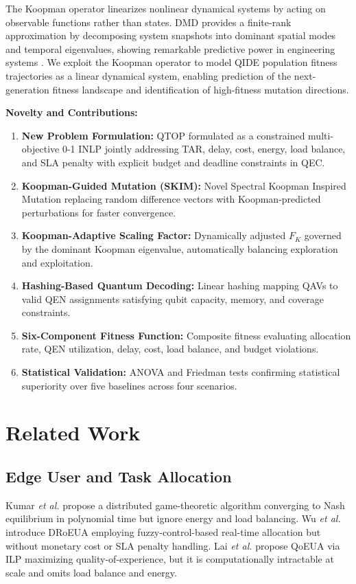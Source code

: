 \documentclass[10pt,twocolumn]{article}
\begin{document}
The Koopman operator \cite{ref10} linearizes nonlinear dynamical systems by acting on observable functions rather than states. DMD \cite{ref20} provides a finite-rank approximation by decomposing system snapshots into dominant spatial modes and temporal eigenvalues, showing remarkable predictive power in engineering systems \cite{ref11,ref17,ref25}. We exploit the Koopman operator to model QIDE population fitness trajectories as a linear dynamical system, enabling prediction of the next-generation fitness landscape and identification of high-fitness mutation directions.

\textbf{Novelty and Contributions:}
\begin{enumerate}[leftmargin=*,itemsep=1pt]
  \item \textbf{New Problem Formulation:} QTOP formulated as a constrained multi-objective 0-1 INLP jointly addressing TAR, delay, cost, energy, load balance, and SLA penalty with explicit budget and deadline constraints in QEC.
  \item \textbf{Koopman-Guided Mutation (SKIM):} Novel Spectral Koopman Inspired Mutation replacing random difference vectors with Koopman-predicted perturbations for faster convergence.
  \item \textbf{Koopman-Adaptive Scaling Factor:} Dynamically adjusted $F_K$ governed by the dominant Koopman eigenvalue, automatically balancing exploration and exploitation.
  \item \textbf{Hashing-Based Quantum Decoding:} Linear hashing mapping QAVs to valid QEN assignments satisfying qubit capacity, memory, and coverage constraints.
  \item \textbf{Six-Component Fitness Function:} Composite fitness evaluating allocation rate, QEN utilization, delay, cost, load balance, and budget violations.
  \item \textbf{Statistical Validation:} ANOVA and Friedman tests confirming statistical superiority over five baselines across four scenarios.
\end{enumerate}

\section{Related Work}

\subsection{Edge User and Task Allocation}
Kumar \textit{et al.} \cite{ref1} propose a distributed game-theoretic algorithm converging to Nash equilibrium in polynomial time but ignore energy and load balancing. Wu \textit{et al.} \cite{ref2} introduce DRoEUA employing fuzzy-control-based real-time allocation but without monetary cost or SLA penalty handling. Lai \textit{et al.} \cite{ref12} propose QoEUA via ILP maximizing quality-of-experience, but it is computationally intractable at scale and omits load balance and energy.
\end{document}
